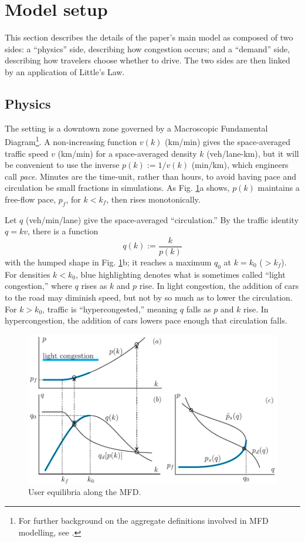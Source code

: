 \documentclass[preprint,authoryear]{elsarticle}
\begin{document}
\section{Model setup}
\label{sec:model_setup}

This section describes the details of the paper's main model as composed of two sides: a ``physics'' side, describing how congestion occurs; and a ``demand'' side, describing how travelers choose whether to drive. The two sides are then linked by an application of Little's Law.

\subsection{Physics}
\label{ssec:physics}

The setting is a downtown zone governed by a Macroscopic Fundamental Diagram\footnote{For further background on the aggregate definitions involved in MFD modelling, see \citet{Daganzo2007}.}. A non-increasing function $v(k)$ (km/min) gives the space-averaged traffic speed $v$ (km/min) for a space-averaged density $k$ (veh/lane-km), but it will be convenient to use the inverse $p(k):=1/v(k)$ (min/km), which engineers call \emph{pace}. Minutes are the time-unit, rather than hours, to avoid having pace and circulation be small fractions in simulations. As Fig. \ref{fig:ue}a shows, $p(k)$ maintains a free-flow pace, $p_f$, for $k<k_f$, then rises monotonically.

Let $q$ (veh/min/lane) give the space-averaged ``circulation.'' By the traffic identity $q=kv$, there is a function
\begin{equation}
	q(k) := \frac{k}{p(k)}
\end{equation}
with the humped shape in Fig. \ref{fig:ue}b; it reaches a maximum $q_0$ at $k=k_0$ ($>k_f$). For densities $k<k_0$, blue highlighting denotes what is sometimes called ``light congestion,'' where $q$ rises as $k$ and $p$ rise. In light congestion, the addition of cars to the road may diminish speed, but not by so much as to lower the circulation. For $k>k_0$, traffic is ``hypercongested,'' meaning $q$ falls as $p$ and $k$ rise. In hypercongestion, the addition of cars lowers pace enough that circulation falls.

\begin{figure}
	\centering
	\includegraphics[width=1\textwidth]{img/equilibrium-k}
	\caption{User equilibria along the MFD.}
	\label{fig:ue}
\end{figure}
\end{document}
